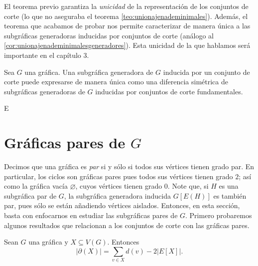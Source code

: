 El teorema previo garantiza la \textit{unicidad} de la representación de los conjuntos de corte (lo que no aseguraba el teorema \ref{teo:unionajenademinimales}). Además, el teorema que acabamos de probar nos permite caracterizar de manera única a las subgráficas generadoras inducidas por conjuntos de corte (análogo al \ref{cor:unionajenademinimalesgeneradores}). Esta unicidad de la que hablamos será importante en el capítulo 3.

\begin{cor}\label{cor:DifSimUnicaDeFundamentales}
Sea $G$ una gráfica. Una subgráfica generadora de $G$ inducida por un conjunto de corte puede expresarse de manera única como una diferencia simétrica de subgráficas generadoras de $G$ inducidas por conjuntos de corte fundamentales.
\end{cor}






E\section{Gráficas pares de $G$}
Decimos que una gráfica es \textit{par}  si y sólo si todos sus vértices tienen grado par. En particular, los ciclos son gráficas pares pues todos sus vértices tienen grado $2$; así como la gráfica vacía $\varnothing$, cuyos vértices tienen grado $0$. Note que, si $H$ es una subgráfica par de $G$, la subgráfica generadora inducida $G[E(H)]$ es también par, pues sólo se están añadiendo vértices aislados. Entonces, en esta sección, basta con enfocarnos en estudiar las subgráficas pares de $G$. Primero probaremos algunos resultados que relacionan a los conjuntos de corte con las gráficas pares.  

\begin{lema} \label{lema1}
Sean $G$ una gráfica y $X \subseteq V(G)$. Entonces
$$
\big|\partial(X)\big|= \sum _{v \in X} d(v)- 2 \big |E[X]\big |.
$$
\end{lema}

